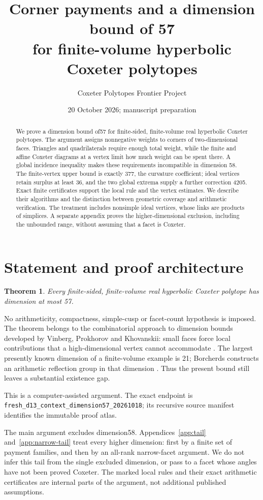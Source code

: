 \documentclass[11pt]{article}
\title{Corner payments and a dimension bound of 57\\
for finite-volume hyperbolic Coxeter polytopes}
\author{Coxeter Polytopes Frontier Project}
\date{20 October 2026; manuscript preparation}
\newtheorem{theorem}{Theorem}
\theoremstyle{remark}\newtheorem{remark}[theorem]{Remark}
\newcommand{\cert}[1]{\nolinkurl{#1}}
\begin{document}
\maketitle
\begin{abstract}
We prove a dimension bound of57 for finite-sided, finite-volume real
hyperbolic Coxeter polytopes. The argument assigns nonnegative weights
to corners of two-dimensional faces. Triangles and quadrilaterals require
enough total weight, while the finite and affine Coxeter diagrams at a
vertex limit how much weight can be spent there. A global incidence
inequality makes these requirements incompatible in dimension 58.
The finite-vertex upper bound is exactly 377, the curvature coefficient;
ideal vertices retain surplus at least 36, and the two global extrema
supply a further correction 4205. Exact finite certificates support the
local rule and the vertex estimates. We describe their algorithms and
the distinction between geometric coverage and arithmetic verification.
The treatment includes nonsimple ideal vertices, whose links are products
of simplices. A separate appendix proves the higher-dimensional exclusion,
including the unbounded range, without assuming that a facet is Coxeter.
\end{abstract}

\section{Statement and proof architecture}
\begin{theorem}\label{thm:main}
Every finite-sided, finite-volume real hyperbolic Coxeter polytope has
dimension at most 57.
\end{theorem}
No arithmeticity, compactness, simple-cusp or facet-count hypothesis is
imposed. The theorem belongs to the combinatorial approach to dimension
bounds developed by Vinberg, Prokhorov and Khovanskii: small faces
force local contributions that a high-dimensional vertex cannot
accommodate \cite{Prokhorov,Khovanskii}. The largest presently known
dimension of a finite-volume example is 21; Borcherds constructs an
arithmetic reflection group in that dimension \cite{Borcherds}.
Thus the present bound still leaves a substantial existence gap.

This is a computer-assisted argument. The exact endpoint is
\cert{fresh_d13_context_dimension57_20261018}; its recursive source
manifest identifies the immutable proof atlas.

The main argument excludes dimension58. Appendices~\ref{app:tail}
and~\ref{app:narrow-tail} treat every higher dimension: first by a finite
set of payment families, and then by an all-rank narrow-facet argument.
We do not infer this tail from the single excluded dimension, or pass
to a facet whose angles have not been proved Coxeter. The marked local
rules and their exact arithmetic certificates are internal parts of
the argument, not additional published assumptions.
\end{document}
